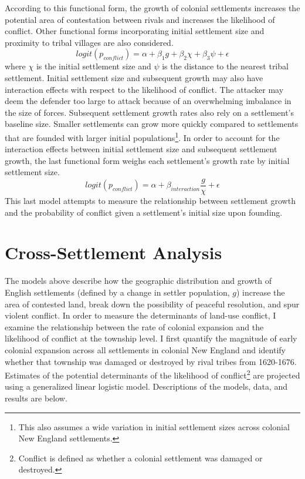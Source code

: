 \documentclass[sn-mathphys]{sn-jnl}%
\theoremstyle{thmstyleone}%
\theoremstyle{thmstyletwo}%
\theoremstyle{thmstylethree}%
\begin{document}
According to this functional form, the growth of colonial settlements increases the potential area of contestation between rivals and increases the likelihood of conflict. Other functional forms incorporating initial settlement size and proximity to tribal villages are also considered.
\begin{equation}
logit(p_{conflict})= \alpha + \beta_{1}g + \beta_{2}\chi + \beta_{3}\psi + \epsilon
\end{equation}
where $\chi$ is the initial settlement size and $\psi$ is the distance to the nearest tribal settlement. Initial settlement size and subsequent growth may also have interaction effects with respect to the likelihood of conflict. The attacker may deem the defender too large to attack because of an overwhelming imbalance in the size of forces. Subsequent settlement growth rates also rely on a settlement's baseline size. Smaller settlements can grow more quickly compared to settlements that are founded with larger initial populations\footnote{This also assumes a wide variation in initial settlement sizes across colonial New England settlements.}. In order to account for the interaction effects between initial settlement size and subsequent settlement growth, the last functional form weighs each settlement's growth rate by initial settlement size.
\begin{equation}
logit(p_{conflict})= \alpha + \beta_{interaction}\frac{g}{\chi} + \epsilon 
\end{equation}
This last model attempts to measure the relationship between settlement growth and the probability of conflict given a settlement's initial size upon founding.

\section{Cross-Settlement Analysis}\label{sec4}

The models above describe how the geographic distribution and growth of English settlements (defined by a change in settler population, $g$) increase the area of contested land, break down the possibility of peaceful resolution, and spur violent conflict.
In order to measure the determinants of land-use conflict, I examine the relationship between the rate of colonial expansion and the likelihood of conflict at the township level. I first quantify the magnitude of early colonial expansion across all settlements in colonial New England and identify whether that township was damaged or destroyed by rival tribes from 1620-1676. Estimates of the potential determinants of the likelihood of conflict\footnote{Conflict is defined as whether a colonial settlement was damaged or destroyed.} are projected using a generalized linear logistic model. Descriptions of the models, data, and results are below.
\end{document}
